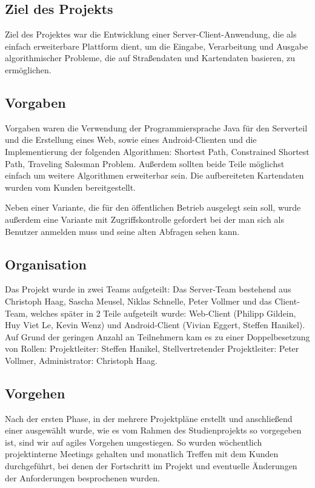 \subsection*{Ziel des Projekts}

Ziel des Projektes war die Entwicklung einer Server-Client-Anwendung, die als einfach erweiterbare Plattform dient, um die Eingabe, Verarbeitung und Ausgabe algorithmischer Probleme, die auf Straßendaten und Kartendaten basieren, zu ermöglichen.

\subsection*{Vorgaben}

Vorgaben waren die Verwendung der Programmiersprache Java für den Serverteil und die Erstellung eines Web, sowie eines Android-Clienten und die Implementierung der folgenden Algorithmen: Shortest Path, Constrained Shortest Path, Traveling Salesman Problem. Außerdem sollten beide Teile möglichst einfach um weitere Algorithmen erweiterbar sein. Die aufbereiteten Kartendaten wurden vom Kunden bereitgestellt.

Neben einer Variante, die für den öffentlichen Betrieb ausgelegt sein soll, wurde außerdem eine Variante mit Zugriffskontrolle gefordert bei der man sich als Benutzer anmelden muss und seine alten Abfragen sehen kann.

\subsection*{Organisation}

Das Projekt wurde in zwei Teams aufgeteilt: Das Server-Team bestehend aus Christoph Haag, Sascha Meusel, Niklas Schnelle, Peter Vollmer und das Client-Team, welches später in 2 Teile aufgeteilt wurde: Web-Client (Philipp Gildein, Huy Viet Le, Kevin Wenz) und Android-Client (Vivian Eggert, Steffen Hanikel). Auf Grund der geringen Anzahl an Teilnehmern kam es zu einer Doppelbesetzung von Rollen: Projektleiter: Steffen Hanikel, Stellvertretender Projektleiter: Peter Vollmer, Administrator: Christoph Haag.

\subsection*{Vorgehen}

Nach der ersten Phase, in der mehrere Projektpläne erstellt und anschließend einer ausgewählt wurde, wie es vom Rahmen des Studienprojekts so vorgegeben ist, sind wir auf agiles Vorgehen umgestiegen. So wurden wöchentlich projektinterne Meetings gehalten und monatlich Treffen mit dem Kunden durchgeführt, bei denen der Fortschritt im Projekt und eventuelle Änderungen der Anforderungen besprochenen wurden.

